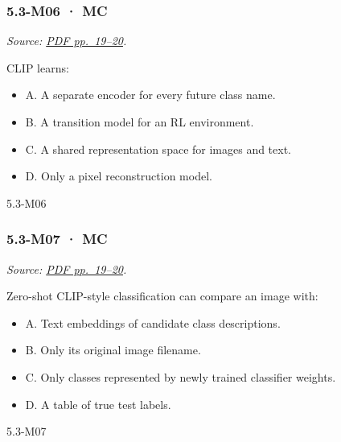 \noindent\begin{minipage}{\linewidth}

\subsubsection{5.3-M06 · MC}\label{m06-mc-14}

\emph{Source:
\href{../Lecture\%20Slides/5.3.\%20Foundation\%20models.pdf\#page=19}{PDF
pp.~19--20}.}

CLIP learns:

\begin{itemize}
\tightlist
\item
  A. A separate encoder for every future class name.
\item
  B. A transition model for an RL environment.
\item
  C. A shared representation space for images and text.
\item
  D. Only a pixel reconstruction model.
\end{itemize}

\begin{solution}[8mm]{5.3-M06}

\end{solution}
\end{minipage}\par\medskip

\noindent\begin{minipage}{\linewidth}

\subsubsection{5.3-M07 · MC}\label{m07-mc-14}

\emph{Source:
\href{../Lecture\%20Slides/5.3.\%20Foundation\%20models.pdf\#page=19}{PDF
pp.~19--20}.}

Zero-shot CLIP-style classification can compare an image with:

\begin{itemize}
\tightlist
\item
  A. Text embeddings of candidate class descriptions.
\item
  B. Only its original image filename.
\item
  C. Only classes represented by newly trained classifier weights.
\item
  D. A table of true test labels.
\end{itemize}

\begin{solution}[8mm]{5.3-M07}

\end{solution}
\end{minipage}\par\medskip

